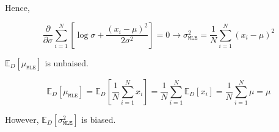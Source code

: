 Hence,

\begin{equation}
	\frac{\partial}{\partial \sigma} \sum_{i=1}^N \left[\log \sigma + \frac{\left(x_i - \mu\right)^2}{2\sigma^2}\right] = 0 \rightarrow \sigma_{\mathtt{MLE}}^2 = \frac{1}{N} \sum_{i=1}^{N} \left(x_i - \mu\right)^2
\end{equation}

\(\mathbb{E}_{D}\left[\mu_{\mathtt{MLE}}\right]\)  is unbaised.

\begin{equation}
	\mathbb{E}_{D}\left[\mu_{\mathtt{MLE}}\right] =   \mathbb{E}_{D}\left[\frac{1}{N} \sum_{i=1}^{N} x_i\right] = \frac{1}{N} \sum_{i=1}^{N} \mathbb{E}_{D}\left[x_i\right] = \frac{1}{N} \sum_{i=1}^{N} \mu = \mu
\end{equation}

However, \(\mathbb{E}_{D}\left[\sigma_{\mathtt{MLE}}^2\right]\) is biased.


